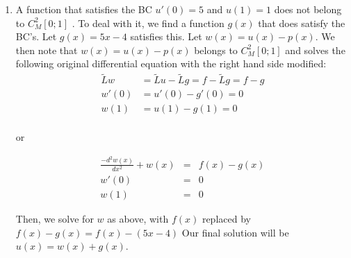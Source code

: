 {\begin{solution}
\begin{enumerate}
where $c_n$ is given in part (c) and $\tilde{\lambda_n}$ in part (b).

\item A function that satisfies the BC $u'(0) = 5 $ and $ u(1) = 1$  does not belong to $C^2_M [0; 1]$ . To deal
with it, we find a function $g(x)$ that does satisfy the BC's. Let  $g(x) = 5x-4$ satisfies this.
Let $w(x)= u(x)-p(x)$. We then note that  $w(x)= u(x)-p(x)$ belongs to $C^2_M [0; 1]$ and solves the following original differential equation with the right hand side modified:
\begin{align*}
\tilde{L}w &= \tilde{L}u- \tilde{L}g = f-\tilde{L}g = f-g\\
w'(0) &= u'(0) - g'(0) = 0\\
w(1) &= u(1)-g(1) = 0\\
\end{align*}

or

\begin{eqnarray*}
\frac{-d^2w(x)}{dx^2}+ w(x)  &=& f(x)-g(x) \\
                        w'(0) &=& 0\\
                        w(1)&=& 0
\end{eqnarray*}

Then, we solve for $w$ as above, with $f(x)$ replaced by $f(x)-g(x) = f(x)-(5x-4)$
Our final solution will be $u(x) = w(x) + g(x)$.


\end{enumerate}
\end{solution}
}{}